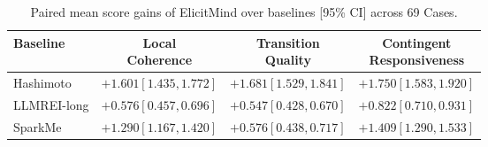\begin{table}[t]
\centering
\caption{Paired mean score gains of ElicitMind over baselines [95\% CI] across 69 Cases.}
\label{tab:rq2-results}
\small
\setlength{\tabcolsep}{3pt}
\begin{tabular*}{\linewidth}{@{\extracolsep{\fill}}lccc@{}}
\toprule
Baseline & \shortstack{Local\\Coherence} & \shortstack{Transition\\Quality} & \shortstack{Contingent\\Responsiveness} \\
\midrule
Hashimoto & $+1.601 [1.435, 1.772]$ & $+1.681 [1.529, 1.841]$ & $+1.750 [1.583, 1.920]$ \\
LLMREI-long & $+0.576 [0.457, 0.696]$ & $+0.547 [0.428, 0.670]$ & $+0.822 [0.710, 0.931]$ \\
SparkMe & $+1.290 [1.167, 1.420]$ & $+0.576 [0.438, 0.717]$ & $+1.409 [1.290, 1.533]$ \\
\bottomrule
\end{tabular*}
\end{table}
